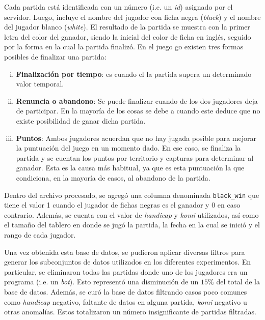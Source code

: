 \documentclass[11pt,twoside, spanish]{report} %
\begin{document}
Cada partida est\'a identificada con un n\'umero (i.e. un \textit{id}) asignado por el servidor.
Luego, incluye el nombre del jugador con ficha negra (\textit{black}) y el nombre del jugador blanco (\textit{white}).
El resultado de la partida se muestra con la primer letra del color del ganador, siendo la inicial del color de ficha en ingl\'es, seguido por la forma en la cual la partida finaliz\'o.
En el juego go existen tres formas posibles de finalizar una partida:
\begin{enumerate}[i)]
\item \textbf{Finalizaci\'on por tiempo}: es cuando el la partida supera un determinado valor temporal.

\item \textbf{Renuncia o abandono}: Se puede finalizar cuando de los dos jugadores deja de participar. En la mayor\'ia de los cosas se debe a cuando este  deduce que no existe posibilidad de ganar dicha partida.

\item \textbf{Puntos}: Ambos jugadores acuerdan que no hay jugada posible para mejorar la puntuaci\'on del juego en un momento dado.
En ese caso, se finaliza la partida y se cuentan los puntos por territorio y capturas para determinar al ganador.
Esta es la causa m\'as habitual, ya que es esta puntuaci\'on la que condiciona, en la mayor\'ia de casos, al abandono de la partida.
\end{enumerate}

Dentro del archivo procesado, se agreg\'o una columna denominada \texttt{black\_win} que tiene el valor 1 cuando el jugador de fichas negras es el ganador y 0 en caso contrario.
Adem\'as, se cuenta con el valor de \textit{handicap} y \textit{komi} utilizados, as\'i como el tama\~no del tablero en donde se jug\'o la partida, la fecha en la cual se inici\'o y el rango de cada jugador.

Una vez obtenida esta base de datos, se pudieron aplicar diversas filtros para generar los subconjuntos de datos utilizados en los diferentes experimentos.
En particular, se eliminaron todas las partidas donde uno de los jugadores era un programa (i.e. un \emph{bot}).
Esto represent\'o una disminuci\'on de un $15\%$ del total de la base de datos.
Adem\'as, se cur\'o la base de datos filtrando casos poco comunes como \textit{handicap} negativo, faltante de datos en alguna partida, \textit{komi} negativo u otras anomal\'ias.
Estos totalizaron un n\'umero insignificante de partidas filtradas.
\end{document}
